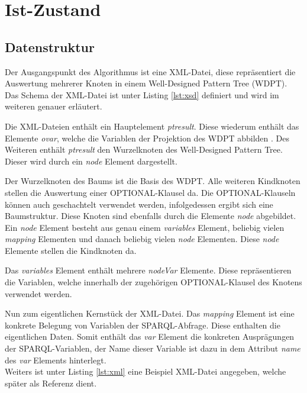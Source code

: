 \documentclass[draft,final]{vutinfth} %
\begin{document}
\chapter{Ist-Zustand}
\section{Datenstruktur} \label{dataStruk}
Der Ausgangspunkt des Algorithmus ist eine XML-Datei, diese repräsentiert die Auswertung  mehrerer Knoten in einem Well-Designed Pattern Tree (WDPT). Das Schema der XML-Datei ist unter Listing \ref{lst:xsd} definiert und wird im weiteren genauer erläutert.

Die XML-Dateien enthält ein Hauptelement \textit{ptresult}. Diese wiederum enthält das Elemente \textit{ovar}, welche die Variablen der Projektion des WDPT abbilden \cite[S.~171]{OptMat}. Des Weiteren enthält \textit{ptresult} den Wurzelknoten des Well-Designed Pattern Tree. Dieser wird durch ein \textit{node} Element dargestellt.

Der Wurzelknoten des Baums ist die Basis des WDPT. Alle weiteren Kindknoten stellen die Auswertung einer OPTIONAL-Klausel da. Die OPTIONAL-Klauseln können auch geschachtelt verwendet werden, infolgedessen ergibt sich eine Baumstruktur. Diese Knoten sind ebenfalls durch die Elemente \textit{node} abgebildet. Ein \textit{node} Element besteht aus genau einem \textit{variables} Element, beliebig vielen \textit{mapping} Elementen und danach beliebig vielen \textit{node} Elementen. Diese \textit{node} Elemente stellen die Kindknoten da.

Das \textit{variables} Element enthält mehrere \textit{nodeVar} Elemente. Diese repräsentieren die Variablen, welche innerhalb der zugehörigen OPTIONAL-Klausel des Knotens verwendet werden.

Nun zum eigentlichen Kernstück der XML-Datei. Das \textit{mapping} Element ist eine konkrete Belegung von Variablen der SPARQL-Abfrage. Diese enthalten die eigentlichen Daten. Somit enthält das \textit{var} Element die konkreten Ausprägungen der SPARQL-Variablen, der Name dieser Variable ist dazu in dem Attribut \textit{name} des \textit{var} Elements hinterlegt.\\


Weiters ist unter Listing \ref{lst:xml} eine Beispiel XML-Datei angegeben, welche später als Referenz dient.

\end{document}
